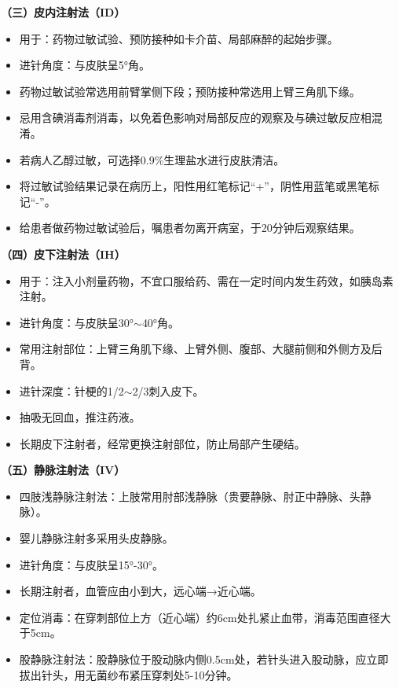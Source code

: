 \documentclass[11pt, a4paper]{ctexart}
\begin{document}
\textbf{（三）皮内注射法（ID）}
\begin{itemize}
	\item 用于：药物过敏试验、预防接种如卡介苗、局部麻醉的起始步骤。
	\item 进针角度：与皮肤呈5°角。
	\item 药物过敏试验常选用前臂掌侧下段；预防接种常选用上臂三角肌下缘。
	\item 忌用含碘消毒剂消毒，以免着色影响对局部反应的观察及与碘过敏反应相混淆。
	\item 若病人乙醇过敏，可选择0.9\%生理盐水进行皮肤清洁。
	\item 将过敏试验结果记录在病历上，阳性用红笔标记“+”，阴性用蓝笔或黑笔标记“-”。
	\item 给患者做药物过敏试验后，嘱患者勿离开病室，于20分钟后观察结果。
\end{itemize}

\textbf{（四）皮下注射法（IH）}
\begin{itemize}
	\item 用于：注入小剂量药物，不宜口服给药、需在一定时间内发生药效，如胰岛素注射。
	\item 进针角度：与皮肤呈30°$\sim$40°角。
	\item 常用注射部位：上臂三角肌下缘、上臂外侧、腹部、大腿前侧和外侧方及后背。
	\item 进针深度：针梗的1/2$\sim$2/3刺入皮下。
	\item 抽吸无回血，推注药液。
	\item 长期皮下注射者，经常更换注射部位，防止局部产生硬结。
\end{itemize}

\textbf{（五）静脉注射法（IV）}
\begin{itemize}
	\item 四肢浅静脉注射法：上肢常用肘部浅静脉（贵要静脉、肘正中静脉、头静脉）。
	\item 婴儿静脉注射多采用头皮静脉。
	\item 进针角度：与皮肤呈15°-30°。
	\item 长期注射者，血管应由小到大，远心端→近心端。
	\item 定位消毒：在穿刺部位上方（近心端）约6cm处扎紧止血带，消毒范围直径大于5cm。
	\item 股静脉注射法：股静脉位于股动脉内侧0.5cm处，若针头进入股动脉，应立即拔出针头，用无菌纱布紧压穿刺处5-10分钟。
\end{itemize}
\end{document}
